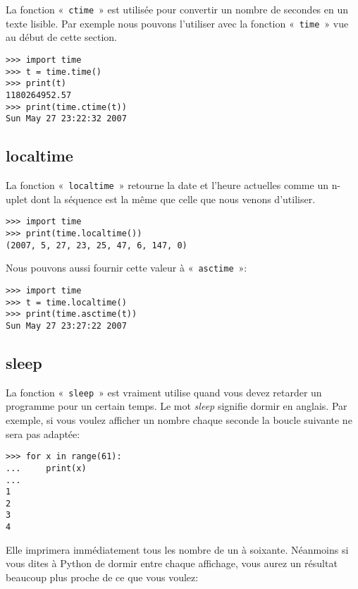 La fonction «~\texttt{ctime}~» est utilisée pour convertir un nombre de secondes en un texte lisible.  Par exemple nous pouvons l'utiliser avec la fonction «~\texttt{time}~» vue au début de cette section.

\begin{Verbatim}[frame=single,rulecolor=\color{gray}]
>>> import time
>>> t = time.time()
>>> print(t)
1180264952.57
>>> print(time.ctime(t))
Sun May 27 23:22:32 2007
\end{Verbatim}


\subsection{localtime}

La fonction «~\texttt{localtime}~» retourne la date et l'heure actuelles comme un n-uplet dont la séquence est la même que celle que nous venons d'utiliser. 

\begin{Verbatim}[frame=single,rulecolor=\color{gray}]
>>> import time
>>> print(time.localtime())
(2007, 5, 27, 23, 25, 47, 6, 147, 0)
\end{Verbatim}


Nous pouvons aussi fournir cette valeur à «~\texttt{asctime}~»:

\begin{Verbatim}[frame=single,rulecolor=\color{gray}]
>>> import time
>>> t = time.localtime()
>>> print(time.asctime(t))
Sun May 27 23:27:22 2007
\end{Verbatim}

\subsection{sleep}

La fonction «~\texttt{sleep}~» est vraiment utilise quand vous devez retarder un programme pour un certain temps. Le mot \emph{sleep} signifie dormir en anglais. Par exemple, si vous voulez afficher un nombre chaque seconde la boucle suivante ne sera pas adaptée:

\begin{Verbatim}[frame=single,rulecolor=\color{gray}]
>>> for x in range(61):
...     print(x)
...
1
2
3
4
\end{Verbatim}

Elle imprimera immédiatement tous les nombre de un à soixante. Néanmoins si vous dites à Python de dormir entre chaque affichage, vous aurez un résultat beaucoup plus proche de ce que vous voulez:


